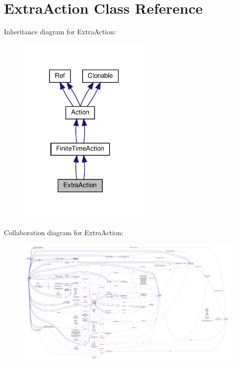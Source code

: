 \hypertarget{classExtraAction}{}\section{Extra\+Action Class Reference}
\label{classExtraAction}


Inheritance diagram for Extra\+Action\+:
\nopagebreak
\begin{figure}[H]
\begin{center}
\leavevmode
\includegraphics[width=186pt]{classExtraAction__inherit__graph}
\end{center}
\end{figure}


Collaboration diagram for Extra\+Action\+:
\nopagebreak
\begin{figure}[H]
\begin{center}
\leavevmode
\includegraphics[width=350pt]{classExtraAction__coll__graph}
\end{center}
\end{figure}
